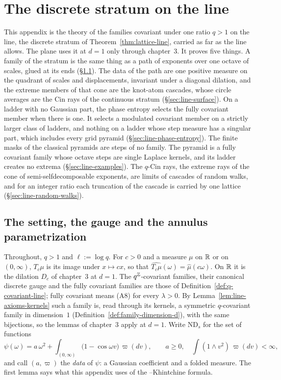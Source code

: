 \chapter{The discrete stratum on the line}
\label{ch:line-appendix}

This appendix is the theory of the families covariant under one ratio $q > 1$ on the line, the
discrete stratum of Theorem~\ref{thm:lattice-line}, carried as far as the line allows. The plane
uses it at $d = 1$ only through chapter~3. It proves five things. A family of the stratum is the
same thing as a path of exponents over one octave of scales, glued at its ends
(\S\ref{sec:line-annulus}). The \Levy{} data of the path are one positive measure on the quadrant of
scales and displacements, invariant under a diagonal dilation, and the extreme members of that cone
are the knot-atom cascades, whose circle averages are the Cin rays of the continuous stratum
(\S\ref{sec:line-surface}). On a ladder with no Gaussian part, the phase entropy selects the
fully covariant member when there is one. It selects a modulated covariant member on a strictly
larger class of ladders, and nothing on a ladder whose step measure has a singular part, which
includes every grid pyramid (\S\ref{sec:line-phase-entropy}). The finite masks of the classical
pyramids are steps of no family. The \Matern{} pyramid is a fully covariant family whose octave
steps are single Laplace kernels, and its ladder creates no extrema (\S\ref{sec:line-examples}).
The $q$-Cin rays, the extreme rays of the cone of semi-selfdecomposable exponents, are limits of
cascades of random walks, and for an integer ratio each truncation of the cascade is carried by
one lattice (\S\ref{sec:line-random-walks}).

\section{The setting, the gauge and the annulus parametrization}
\label{sec:line-annulus}

Throughout, $q > 1$ and $\ell := \log q$. For $c > 0$ and a measure $\mu$ on $\mathbb{R}$ or on
$(0,\infty)$, $T_c\mu$ is its image under $x \mapsto cx$, so that
$\widehat{T_c\mu}(\omega) = \widehat\mu(c\omega)$. On $\mathbb{R}$ it is the dilation $D_c$ of chapter~3
at $d = 1$. The $q^{\mathbb{Z}}$-covariant families, their canonical discrete gauge and the fully
covariant families are those of Definition~\ref{def:q-covariant-line}; fully covariant means (A8)
for every $\lambda > 0$. By Lemma~\ref{lem:line-axioms-kernels} such a family is, read through its
kernels, a symmetric $q$-covariant family in dimension~$1$ (Definition~\ref{def:family-dimension-d}),
with the same bijections, so the lemmas of chapter~3 apply at $d = 1$. Write $\mathrm{ND}_s$ for the
set of functions
\[
  \psi(\omega) = a\,\omega^2 + \int_{(0,\infty)}\bigl(1 - \cos\omega v\bigr)\,\varpi(dv), \qquad
  a \ge 0, \quad \int(1 \wedge v^2)\,\varpi(dv) < \infty ,
\]
and call $(a, \varpi)$ the \emph{data} of $\psi$: a Gaussian coefficient and a folded \Levy{}
measure. The first lemma says what this appendix uses of the \Levy{}--Khintchine formula.

